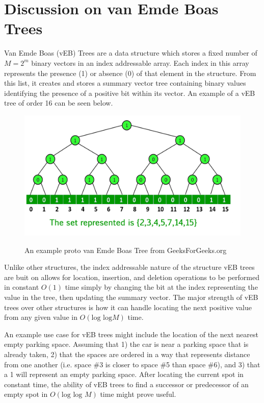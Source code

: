 \documentclass{article}
\begin{document}
\section*{Discussion on van Emde Boas Trees}

Van Emde Boas (vEB) Trees are a data structure which stores a fixed number of ${M = 2^m}$ binary vectors in an index addressable array. Each index in this array represents the presence (1) or absence (0) of that element in the structure. From this list, it creates and stores a summary vector tree containing binary values identifying the presence of a positive bit within its vector. An example of a vEB tree of order 16 can be seen below.

\begin{figure}[h]
    \centering
    \includegraphics[width=\textwidth,keepaspectratio]{Images/vEB_tree_GFG.jpg}
    \label{fig: vEB}
    \caption{An example proto van Emde Boas Tree from GeeksForGeeks.org}
\end{figure}

Unlike other structures, the index addressable nature of the structure vEB trees are buit on allows for location, insertion, and deletion operations to be performed in constant $O(\text{1})$ time simply by changing the bit at the index representing the value in the tree, then updating the summary vector. The major strength of vEB trees over other structures is how it can handle locating the next positive value from any given value in $O(\text{log log} M)$ time.

An example use case for vEB trees might include the location of the next nearest empty parking space. Assuming that 1) the car is near a parking space that is already taken, 2) that the spaces are ordered in a way that represents distance from one another (i.e. space \#3 is closer to space \#5 than space \#6), and 3) that a 1 will represent an empty parking space. After locating the current spot in constant time, the ability of vEB trees to find a successor or predecessor of an empty spot in $O(\text{log log } M)$ time might prove useful.
\end{document}
